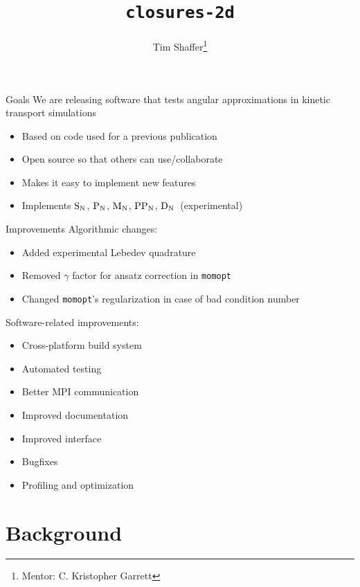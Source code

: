 \documentclass{beamer}
\title{\texttt{closures-2d}}
\author{Tim Shaffer\thanks{Mentor: C. Kristopher Garrett}}
\newcommand{\SN}{\ensuremath{\textnormal{S}_\textnormal{N}}\xspace}
\newcommand{\PN}{\ensuremath{\textnormal{P}_\textnormal{N}}\xspace}
\newcommand{\MN}{\ensuremath{\textnormal{M}_\textnormal{N}}\xspace}
\newcommand{\PPN}{\ensuremath{\textnormal{PP}_\textnormal{N}}\xspace}
\newcommand{\DN}{\ensuremath{\textnormal{D}_\textnormal{N}}\xspace}
\begin{document}
    \frame{\titlepage}

    \begin{frame}{Goals}
        We are releasing software that tests angular approximations in kinetic transport simulations
        \begin{itemize}
            \item Based on code used for a previous publication
            \item Open source so that others can use/collaborate
            \item Makes it easy to implement new features
            \item Implements \SN, \PN, \MN, \PPN, \DN~(experimental)
        \end{itemize}
    \end{frame}

    \begin{frame}{Improvements}
        Algorithmic changes:
        \begin{itemize}
            \item Added experimental Lebedev quadrature
            \item Removed $\gamma$ factor for ansatz correction in \texttt{momopt}
            \item Changed \texttt{momopt}'s regularization in case of bad condition number
        \end{itemize}

        \vfill

        Software-related improvements:
        \begin{itemize}
            \item Cross-platform build system
            \item Automated testing
            \item Better MPI communication
            \item Improved documentation
            \item Improved interface
            \item Bugfixes
            \item Profiling and optimization
        \end{itemize}
    \end{frame}

\section{Background}
\end{document}
